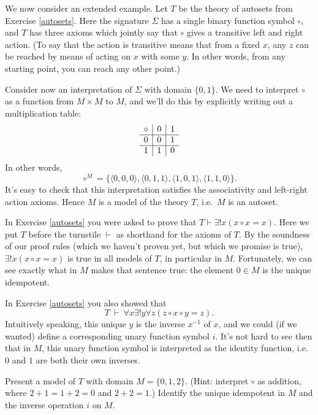  \begin{example} We now consider an extended example.  Let $T$ be the
   theory of autosets from Exercise \ref{autosets}.  Here the
   signature $\Sigma$ has a single binary function symbol $\circ$, and
   $T$ has three axioms which jointly say that $\circ$ gives a
   transitive left and right action.  (To say that the action is
   transitive means that from a fixed $x$, any $z$ can be reached by
   means of acting on $x$ with some $y$.  In other words, from any
   starting point, you can reach any other point.)

Consider now an interpretation of $\Sigma$ with domain
$\{ 0,1\}$.  We need to interpret $\circ$ as a function
from $M\times M$ to $M$, and we'll do this by explicitly writing out a
multiplication table:
\[ \begin{array}{c | c | c} \circ & 0 & 1 \\ \hline 0 & 0 & 1 \\
     \hline 1 & 1 & 0 \end{array} \] In other words,
 \[ \circ ^M = \{ \langle 0,0,0\rangle ,\langle 0,1,1\rangle ,\langle
   1,0,1\rangle ,\langle 1,1,0\rangle \} .\] It's easy to check that
 this interpretation satisfies the associativity and left-right action
 axioms.  Hence $M$ is a model of the theory $T$, i.e.\ $M$ is an
 autoset.

 In Exercise \ref{autosets} you were asked to prove that
 $T\vdash \exists !x(x\circ x=x)$.  Here we put $T$ before the
 turnstile $\vdash$ as shorthand for the axioms of $T$.  By the
 soundness of our proof rules (which we haven't proven yet, but which
 we promise is true), $\exists !x(x\circ x=x)$ is true in all models
 of $T$, in particular in $M$.  Fortunately, we can see exactly what
 in $M$ makes that sentence true: the element $0\in M$ is the unique
 idempotent.

In Exercise \ref{autosets} you also showed that
\[ T\:\vdash\: \forall x\exists !y\forall z(z\circ x\circ y=z) .\]
Intuitively speaking, this unique $y$ is the inverse $x^{-1}$ of $x$,
and we could (if we wanted) define a corresponding unary function
symbol $i$.  It's not hard to see then that in $M$, this unary
function symbol is interpreted as the identity function, i.e.\ $0$ and
$1$ are both their own inverses. \end{example}

\begin{exercise} Present a model of $T$ with domain $M=\{ 0,1,2\}$.
  (Hint: interpret $\circ$ as addition, where $2+1=1+2=0$ and
  $2+2=1$.)  Identify the unique idempotent in $M$ and the inverse
  operation $i$ on $M$.  \end{exercise}

